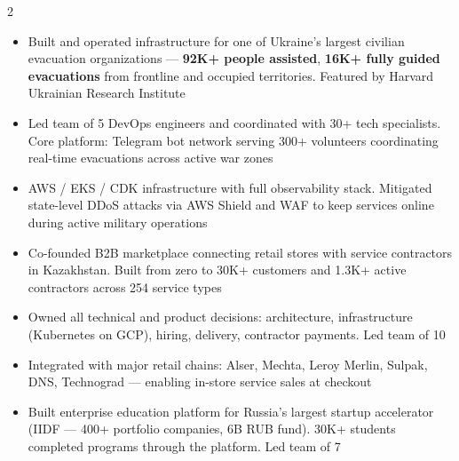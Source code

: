 \documentclass[10pt,a4paper,ragged2e,withhyper]{altacv}
\begin{document}
\begin{paracol}{2}
\divider

\begin{itemize}
\item Built and operated infrastructure for one of Ukraine's largest civilian evacuation organizations --- \textbf{92K+ people assisted}, \textbf{16K+ fully guided evacuations} from frontline and occupied territories. Featured by Harvard Ukrainian Research Institute
\item Led team of 5 DevOps engineers and coordinated with 30+ tech specialists. Core platform: Telegram bot network serving 300+ volunteers coordinating real-time evacuations across active war zones
\item AWS / EKS / CDK infrastructure with full observability stack. Mitigated state-level DDoS attacks via AWS Shield and WAF to keep services online during active military operations
\end{itemize}

\divider

\begin{itemize}
\item Co-founded B2B marketplace connecting retail stores with service contractors in Kazakhstan. Built from zero to 30K+ customers and 1.3K+ active contractors across 254 service types
\item Owned all technical and product decisions: architecture, infrastructure (Kubernetes on GCP), hiring, delivery, contractor payments. Led team of 10
\item Integrated with major retail chains: Alser, Mechta, Leroy Merlin, Sulpak, DNS, Technograd --- enabling in-store service sales at checkout
\end{itemize}

\divider

\begin{itemize}
\item Built enterprise education platform for Russia's largest startup accelerator (IIDF --- 400+ portfolio companies, 6B RUB fund). 30K+ students completed programs through the platform. Led team of 7
\end{itemize}

\divider


\end{paracol}
\end{document}
